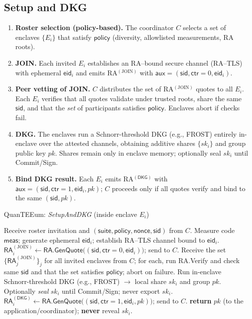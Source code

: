 \documentclass[runningheads,orivec]{llncs}
\newcommand{\prot}{\textsf{QuanTEEum}}
\newcommand{\FROST}{\textsf{FROST}}
\begin{document}
\subsection{Setup and DKG}
\begin{enumerate}[leftmargin=*,itemsep=0.25em]
  \item \textbf{Roster selection (policy-based).} The coordinator $C$ selects a set of enclaves $\{E_i\}$ that satisfy $\mathsf{policy}$ (diversity, allowlisted measurements, RA roots).
  \item \textbf{JOIN.} Each invited $E_i$ establishes an RA–bound secure channel (RA–TLS) with ephemeral $\mathsf{eid}_i$ and emits
        RA$^{(\mathrm{JOIN})}$ with $\mathsf{aux}=(\mathsf{sid},\mathsf{ctr}{=}0,\mathsf{eid}_i)$.
  \item \textbf{Peer vetting of JOIN.} $C$ distributes the set of RA$^{(\mathrm{JOIN})}$ quotes to all $E_i$.
        Each $E_i$ verifies that all quotes validate under trusted roots, share the same $\mathsf{sid}$,
        and that the \emph{set} of participants satisfies $\mathsf{policy}$. Enclaves abort if checks fail.
  \item \textbf{DKG.} The enclaves run a Schnorr-threshold DKG (e.g., \FROST{}) entirely in\mbox{-}enclave over the attested channels,
        obtaining additive shares $\{sk_i\}$ and group public key $pk$. Shares remain only in enclave memory; optionally seal $sk_i$ until Commit/Sign.
  \item \textbf{Bind DKG result.} Each $E_i$ emits RA$^{(\mathsf{DKG})}$ with $\mathsf{aux}=(\mathsf{sid},\mathsf{ctr}{=}1,\mathsf{eid}_i,pk)$;
        $C$ proceeds only if all quotes verify and bind to the same $(\mathsf{sid},pk)$.
\end{enumerate}

\begin{algorithm}[!htbp]
\caption{\prot{}: \emph{SetupAndDKG} (inside enclave $E_i$)}
\label{alg:setup}
\begin{small}
\begin{algorithmic}[1]
\State Receive roster invitation and $(\mathsf{suite},\mathsf{policy},\mathsf{nonce},\mathsf{sid})$ from $C$.
\State Measure code $\mathsf{meas}$; generate ephemeral $\mathsf{eid}_i$; establish RA--TLS channel bound to $\mathsf{eid}_i$.
\State $\mathsf{RA}^{(\mathrm{JOIN})}_i \gets \textsf{RA.GenQuote}\big((\mathsf{sid},\mathsf{ctr}{=}0,\mathsf{eid}_i)\big)$; send to $C$.
\State Receive the set $\{\mathsf{RA}^{(\mathrm{JOIN})}_j\}_j$ for all invited enclaves from $C$; for each, run \textsf{RA.Verify} and check same $\mathsf{sid}$ and that the set satisfies $\mathsf{policy}$; abort on failure.
\State Run in\mbox{-}enclave Schnorr-threshold DKG (e.g., \FROST{}) $\rightarrow$ local share $sk_i$ and group $pk$.
\State Optionally \emph{seal} $sk_i$ until Commit/Sign; never export $sk_i$.
\State $\mathsf{RA}^{(\mathsf{DKG})}_i \gets \textsf{RA.GenQuote}\big((\mathsf{sid},\mathsf{ctr}{=}1,\mathsf{eid}_i,pk)\big)$; send to $C$.
\State \textbf{return} $pk$ (to the application/coordinator); \textbf{never} reveal $sk_i$.
\end{algorithmic}
\end{small}
\end{algorithm}
\end{document}
